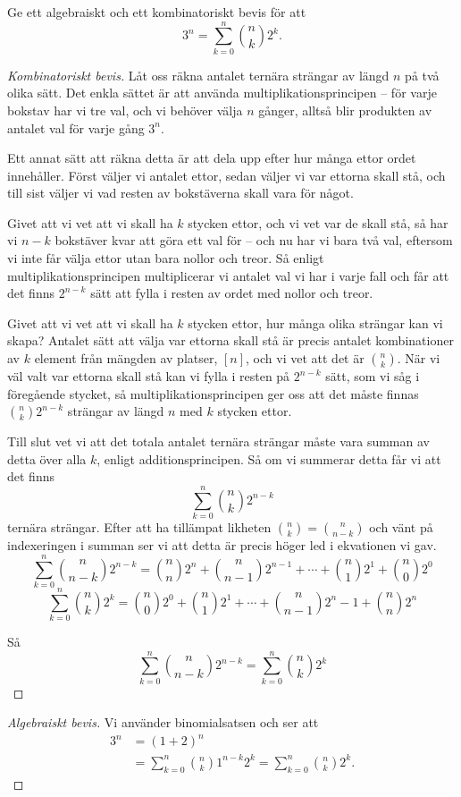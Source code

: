 \documentclass[nobib]{tufte-handout}
\begin{document}
\begin{example}
  Ge ett algebraiskt och ett kombinatoriskt bevis för att
  $$3^n = \sum_{k=0}^n \binom{n}{k}2^k.$$

  \begin{proof}[Kombinatoriskt bevis]
    Låt oss räkna antalet ternära strängar av längd $n$ på två olika sätt. Det enkla sättet är att använda multiplikationsprincipen -- för varje bokstav har vi tre val, och vi behöver välja $n$ gånger, alltså blir produkten av antalet val för varje gång $3^n$.

    Ett annat sätt att räkna detta är att dela upp efter hur många ettor ordet innehåller. Först väljer vi antalet ettor, sedan väljer vi var ettorna skall stå, och till sist väljer vi vad resten av bokstäverna skall vara för något.

    Givet att vi vet att vi skall ha $k$ stycken ettor, och vi vet var de skall stå, så har vi $n-k$ bokstäver kvar att göra ett val för -- och nu har vi bara två val, eftersom vi inte får välja ettor utan bara nollor och treor. Så enligt multiplikationsprincipen multiplicerar vi antalet val vi har i varje fall och får att det finns $2^{n-k}$ sätt att fylla i resten av ordet med nollor och treor.

    Givet att vi vet att vi skall ha $k$ stycken ettor, hur många olika strängar kan vi skapa? Antalet sätt att välja var ettorna skall stå är precis antalet kombinationer av $k$ element från mängden av platser, $[n]$, och vi vet att det är $\binom{n}{k}$. När vi väl valt var ettorna skall stå kan vi fylla i resten på $2^{n-k}$ sätt, som vi såg i föregående stycket, så multiplikationsprincipen ger oss att det måste finnas $\binom{n}{k}2^{n-k}$ strängar av längd $n$ med $k$ stycken ettor.

    Till slut vet vi att det totala antalet ternära strängar måste vara summan av detta över alla $k$, enligt additionsprincipen. Så om vi summerar detta får vi att det finns
    $$\sum_{k=0}^n \binom{n}{k}2^{n-k}$$
    ternära strängar. Efter att ha tillämpat likheten $\binom{n}{k} = \binom{n}{n-k}$ och vänt på indexeringen i summan ser vi att detta är precis höger led i ekvationen vi gav.
        $$\sum_{k=0}^n \binom{n}{n-k}2^{n-k}=\binom{n}{n}2^n+\binom{n}{n-1}2^{n-1}+\cdots+\binom{n}{1}2^1+\binom{n}{0}2^0$$
    $$\sum_{k=0}^n \binom{n}{k}2^k=\binom{n}{0}2^0+\binom{n}{1}2^{1}+\cdots+\binom{n}{n-1}2^n-1+\binom{n}{n}2^n$$

    Så 
    $$\sum_{k=0}^n \binom{n}{n-k}2^{n-k}=\sum_{k=0}^n \binom{n}{k}2^k$$
  \end{proof}

  \begin{proof}[Algebraiskt bevis]
    Vi använder binomialsatsen och ser att
    \begin{align*}
      3^n &= (1+2)^n\\
      &= \sum_{k=0}^n \binom{n}{k}1^{n-k}2^k = \sum_{k=0}^n \binom{n}{k}2^k.
    \end{align*}
  \end{proof}
\end{example}
\end{document}
